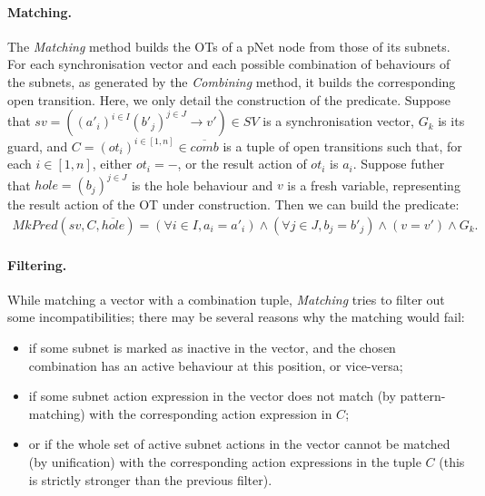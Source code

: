 \documentclass[smallcondensed]{svjour3}
\begin{document}



\paragraph{Matching.}
The \emph{Matching} method builds the OTs of a pNet node from those of
its subnets.
For each synchronisation vector and each possible
combination of behaviours of the subnets, as generated by the \emph
{Combining} method, it builds the corresponding open transition.
Here, we only detail the construction of the predicate.
Suppose that $sv = \left((a'_i)^{i\in I} (b'_j)^{j\in J}\rightarrow v'\right) \in SV$ is a synchronisation vector, $G_k$ is its guard, and
$C = ({ot}_i)^{i \in [1,n]} \in \overline{comb}$ is a tuple of open transitions such that, for each $i \in [1,n]$, either $ot_i = -$, or the result action of $ot_i$ is $a_i$. Suppose futher that $\mathit{hole} = (b_j)^{j \in J}$ is the hole behaviour and $v$ is a fresh variable, representing the result action of the OT under construction. Then we can  build the predicate:
%
\begin{multline*}
  \mathit{MkPred}(sv, C, \overline{\mathit{hole}}) = 
  (\forall i\in I, a_i=a'_i) \land
  (\forall j\in J, b_j=b'_j) \land
  (v=v') \land G_k.
\end{multline*}


\paragraph{Filtering.}
While matching a vector with a combination tuple, \emph{Matching}
tries to filter out some incompatibilities; there may be several
reasons why the matching would fail: 
\begin{itemize}
  \item if some subnet is marked as inactive in the vector, and the
    chosen combination has an active behaviour at this position, or vice-versa;
  \item if some subnet action expression in the vector does not match (by
    pattern-matching) with the corresponding action expression in $C$;
  \item or if the whole set of active subnet actions in the vector
    cannot be matched (by unification) with the corresponding action expressions
      in the tuple $C$ (this is strictly stronger than the
      previous filter). 
\end {itemize}
\end{document}
